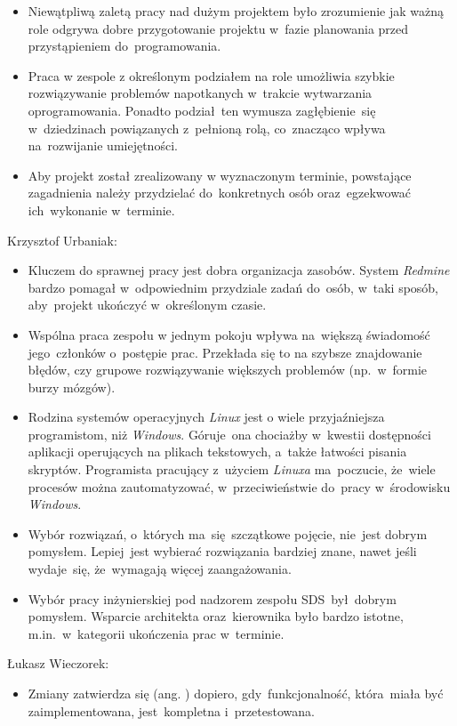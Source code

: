 \begin{description}
\begin{itemize}
\item Niewątpliwą zaletą pracy nad dużym projektem było zrozumienie jak ważną role odgrywa dobre przygotowanie projektu w~fazie planowania przed przystąpieniem do~programowania.
\item Praca w zespole z określonym podziałem na role umożliwia szybkie rozwiązywanie problemów napotkanych w~trakcie wytwarzania oprogramowania. Ponadto podział~ten wymusza zagłębienie~się w~dziedzinach powiązanych z~pełnioną rolą, co~znacząco wpływa na~rozwijanie umiejętności.
\item Aby projekt został zrealizowany w wyznaczonym terminie, powstające zagadnienia należy przydzielać do~konkretnych osób oraz~egzekwować ich~wykonanie w~terminie.
\end{itemize}
\item Krzysztof Urbaniak:
\begin{itemize}
\item Kluczem do sprawnej pracy jest dobra organizacja zasobów. System \textit{Redmine} bardzo pomagał w~odpowiednim przydziale zadań do~osób, w~taki sposób, aby~projekt ukończyć w~określonym czasie.
\item Wspólna praca zespołu w jednym pokoju wpływa na~większą świadomość jego~członków o~postępie prac. Przekłada się to na szybsze znajdowanie błędów, czy grupowe rozwiązywanie większych problemów (np.~w~formie burzy mózgów).
\item Rodzina systemów operacyjnych \textit{Linux} jest o wiele przyjaźniejsza programistom, niż \textit{Windows}. Góruje~ona chociażby w~kwestii dostępności aplikacji operujących na plikach tekstowych, a~także łatwości pisania skryptów. Programista pracujący z~użyciem \textit{Linuxa} ma~poczucie, że~wiele procesów można zautomatyzować, w~przeciwieństwie do~pracy w~środowisku \textit{Windows}.
\item Wybór rozwiązań, o~których ma~się~szczątkowe pojęcie, nie~jest dobrym pomysłem. Lepiej~jest wybierać rozwiązania bardziej znane, nawet jeśli wydaje~się, że~wymagają więcej zaangażowania.
\item Wybór pracy inżynierskiej pod nadzorem zespołu SDS~był~dobrym pomysłem. Wsparcie architekta oraz~kierownika było bardzo istotne, m.in.~w~kategorii ukończenia prac w~terminie.
\end{itemize}
\item Łukasz Wieczorek:
\begin{itemize}
\item Zmiany zatwierdza się (ang. ) dopiero, gdy~funkcjonalność, która~miała być zaimplementowana, jest~kompletna i~przetestowana.

\end{itemize}
\end{description}
